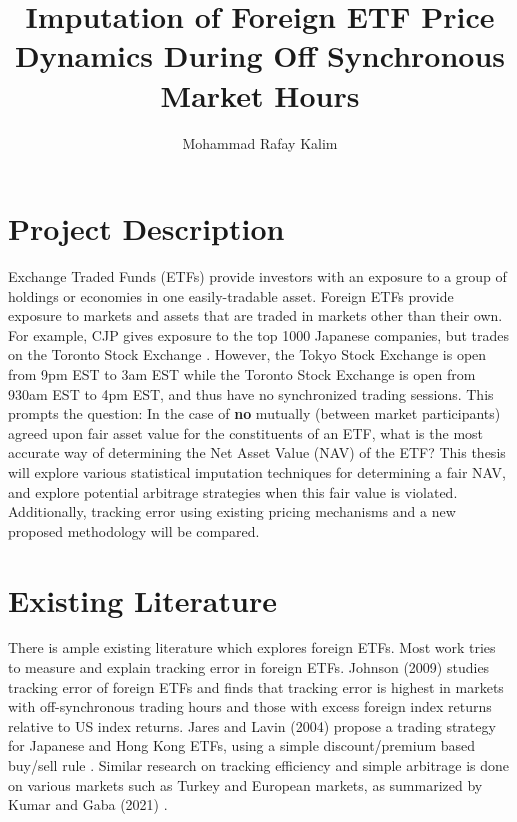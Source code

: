 \documentclass[12pt]{article}
\title{Imputation of Foreign ETF Price Dynamics During Off Synchronous Market Hours}
\author{Mohammad Rafay Kalim }
\date{\vspace{-5ex}}
\begin{document}
\maketitle

\section{Project Description}
Exchange Traded Funds (ETFs) provide investors with an exposure to a group of holdings or economies in one easily-tradable asset. Foreign ETFs provide exposure to markets and assets that are traded in markets other than their own. For example, CJP gives exposure to the top 1000 Japanese companies, but trades on the Toronto Stock Exchange \cite{blackrock}. However, the Tokyo Stock Exchange is open from 9pm EST to 3am EST while the Toronto Stock Exchange is open from 930am EST to 4pm EST, and thus have no synchronized trading sessions. This prompts the question: In the case of \textbf{no} mutually (between market participants) agreed upon fair asset value for the constituents of an ETF, what is the most accurate way of determining the Net Asset Value (NAV) of the ETF? This thesis will explore various statistical imputation techniques for determining a fair NAV, and explore potential arbitrage strategies when this fair value is violated. Additionally, tracking error using existing pricing mechanisms and a new proposed methodology will be compared.

\section{Existing Literature}
There is ample existing literature which explores foreign ETFs.  Most work tries to measure and explain tracking error in foreign ETFs. Johnson (2009) studies tracking error of foreign ETFs and finds that tracking error is highest in markets with off-synchronous trading hours and those with excess foreign index returns relative to US index returns. \cite{johnson2009}  Jares and Lavin (2004) propose a trading strategy for Japanese and Hong Kong ETFs, using a simple discount/premium based buy/sell rule \cite{jares2004japan}. Similar research on tracking efficiency and simple arbitrage is done on various markets such as Turkey and European markets, as summarized by Kumar and Gaba (2021) \cite{gaba2021tracking}.
\end{document}
